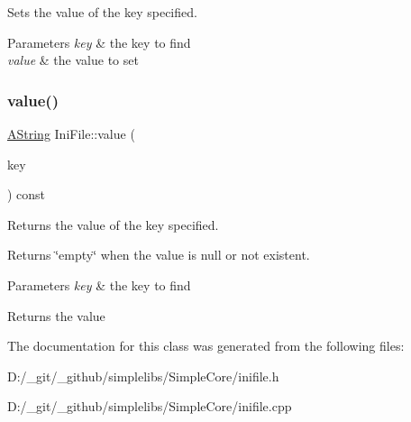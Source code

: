 Sets the value of the key specified. 


\begin{DoxyParams}{Parameters}
{\em key} & the key to find \\
\hline
{\em value} & the value to set \\
\hline
\end{DoxyParams}
\mbox{\label{class_ini_file_acb73544bb44139f7d9b23a36a666abf9}} 
\subsubsection{\texorpdfstring{value()}{value()}}
{\footnotesize\ttfamily \mbox{\hyperlink{class_a_string}{A\+String}} Ini\+File\+::value (\begin{DoxyParamCaption}\item[{const \mbox{\hyperlink{class_a_string}{A\+String}} \&}]{key }\end{DoxyParamCaption}) const}



Returns the value of the key specified. 

Returns \char`\"{}empty\char`\"{} when the value is null or not existent.


\begin{DoxyParams}{Parameters}
{\em key} & the key to find \\
\hline
\end{DoxyParams}
\begin{DoxyReturn}{Returns}
the value 
\end{DoxyReturn}


The documentation for this class was generated from the following files\+:\begin{DoxyCompactItemize}
\item 
D\+:/\+\_\+git/\+\_\+github/simplelibs/\+Simple\+Core/inifile.\+h\item 
D\+:/\+\_\+git/\+\_\+github/simplelibs/\+Simple\+Core/inifile.\+cpp\end{DoxyCompactItemize}
